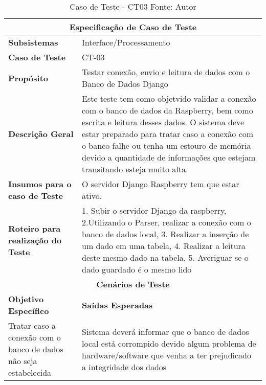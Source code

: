 \begin{table}[H]
    \begin{center}
        \begin{tabular}{|p{5cm}|p{12cm}|}
            \hline
            \multicolumn{2}{|c|}{\textbf{Especificação de Caso de Teste}} \\ \hline
                \textbf{Subsistemas}                               & Interface/Processamento\\ \hline
                \textbf{Caso de Teste}                             & CT-03 \\ \hline
                \textbf{Propósito}                                     & Testar conexão, envio e leitura de dados com o Banco de Dados Django \\ \hline
                \textbf{Descrição Geral}                           & Este teste tem como objetvido validar a conexão com o banco de dados da Raspberry, bem como escrita e leitura desses dados. O sistema deve estar preparado para tratar caso a conexão com o banco falhe ou tenha um estouro de memória devido a quantidade de informações que estejam transitando esteja muito alta. \\ \hline
                \textbf{Insumos para o caso de Teste}    & O servidor Django Raspberry tem que estar ativo. \\ \hline
                \textbf{Roteiro para realização do Teste}&  1. Subir o servidor Django da raspberry, 2.Utilizando o Parser, realizar a conexão com o banco de dados local, 3. Realizar a inserção de um dado em uma tabela, 4. Realizar a leitura deste mesmo dado na tabela, 5. Averiguar se o dado guardado é o mesmo lido  \\ \hline
            \multicolumn{2}{|c|}{\textbf{Cenários de Teste}} \\ \hline
                \textbf{Objetivo Específico}                      & \textbf{Saídas Esperadas} \\ \hline
                Tratar caso a conexão com o banco de dados não seja estabelecida & Sistema deverá informar que o banco de dados local está corrompido devido algum problema de hardware/software que venha a ter prejudicado a integridade dos dados \\ \hline
        \end{tabular}
    \end{center}
    \caption[Caso de Teste - CT03]{Caso de Teste - CT03
    \protect Fonte: Autor}
    \label{CT-03}
\end{table}

